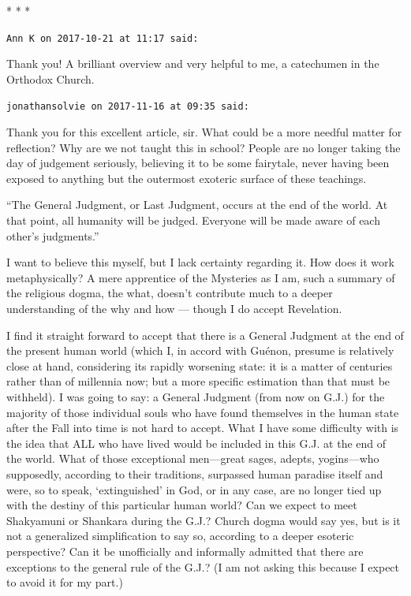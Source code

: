 
\begin{center}* * *\end{center}

\begin{footnotesize}\begin{sffamily}

\texttt{Ann K on 2017-10-21 at 11:17 said: }

Thank you! A brilliant overview and very helpful to me, a catechumen in the Orthodox Church.


\hfill

\texttt{jonathansolvie on 2017-11-16 at 09:35 said: }

Thank you for this excellent article, sir. What could be a more needful matter for reflection? Why are we not taught
this in school? People are no longer taking the day of judgement seriously, believing it to be some fairytale, never
having been exposed to anything but the outermost exoteric surface of these teachings. 

“The General Judgment, or Last Judgment, occurs at the end of the world. At that point, all humanity will be judged.
Everyone will be made aware of each other's judgments.”

I want to believe this myself, but I lack certainty regarding it. How does it work metaphysically? A mere apprentice of
the Mysteries as I am, such a summary of the religious dogma, the what, doesn't contribute much to a deeper
understanding of the why and how — though I do accept Revelation. 

I find it straight forward to accept that there is a General Judgment at the end of the present human world (which I, in
accord with Guénon, presume is relatively close at hand, considering its rapidly worsening state: it is a matter of
centuries rather than of millennia now; but a more specific estimation than that must be withheld). I was going to say:
a General Judgment (from now on G.J.) for the majority of those individual souls who have found themselves
in the human state after the Fall into time is not hard to accept. What I have some difficulty with is the idea that
ALL who have lived would be included in this G.J. at the end of the world. What of those exceptional
men—great sages, adepts, yogins—who supposedly, according to their traditions, surpassed human
paradise itself and were, so to speak, ‘extinguished’ in God, or in any case, are no longer
tied up with the destiny of this particular human world? Can we expect to meet Shakyamuni or Shankara during the G.J.?
Church dogma would say yes, but is it not a generalized simplification to say so, according to a deeper esoteric
perspective? Can it be unofficially and informally admitted that there are exceptions to the general rule of the G.J.?
(I am not asking this because I expect to avoid it for my part.) 


\end{sffamily}
\end{footnotesize}
